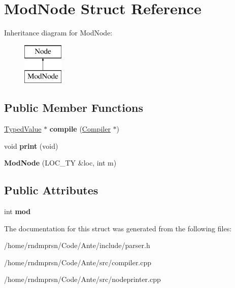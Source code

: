 \hypertarget{structModNode}{}\section{Mod\+Node Struct Reference}
\label{structModNode}
Inheritance diagram for Mod\+Node\+:\begin{figure}[H]
\begin{center}
\leavevmode
\includegraphics[height=2.000000cm]{structModNode}
\end{center}
\end{figure}
\subsection*{Public Member Functions}
\begin{DoxyCompactItemize}
\item 
\mbox{\label{structModNode_a44c3b95cf0877d25efbe0cec58487eec}} 
\hyperlink{structTypedValue}{Typed\+Value} $\ast$ {\bfseries compile} (\hyperlink{structante_1_1Compiler}{Compiler} $\ast$)
\item 
\mbox{\label{structModNode_a6b249016499b3cd665c715bc82fef5f6}} 
void {\bfseries print} (void)
\item 
\mbox{\label{structModNode_a5288cd12ef798d0cf14d80a107084919}} 
{\bfseries Mod\+Node} (L\+O\+C\+\_\+\+TY \&loc, int m)
\end{DoxyCompactItemize}
\subsection*{Public Attributes}
\begin{DoxyCompactItemize}
\item 
\mbox{\label{structModNode_a1611c0f5451523c76cd4dd4b0a7c50eb}} 
int {\bfseries mod}
\end{DoxyCompactItemize}


The documentation for this struct was generated from the following files\+:\begin{DoxyCompactItemize}
\item 
/home/rndmprsn/\+Code/\+Ante/include/parser.\+h\item 
/home/rndmprsn/\+Code/\+Ante/src/compiler.\+cpp\item 
/home/rndmprsn/\+Code/\+Ante/src/nodeprinter.\+cpp\end{DoxyCompactItemize}

